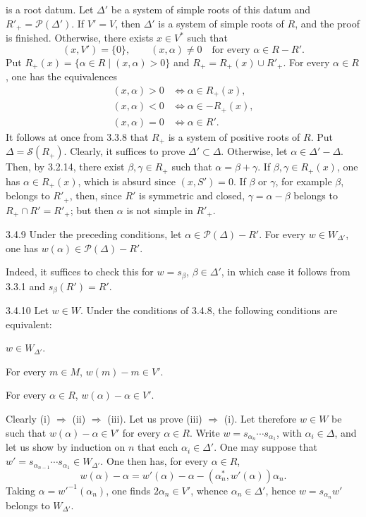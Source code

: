 is a root datum. Let $\Delta'$ be a system of simple roots of this datum and $R'_+=\mathcal P(\Delta')$. If $V'=V$, then $\Delta'$ is a system of simple roots of $R$, and the proof is finished. Otherwise, there exists $x\in V^*$ such that
\[
(x,V')=\{0\},\qquad(x,\alpha)\ne0\quad\text{for every }\alpha\in R-R'.
\]
Put $R_+(x)=\{\alpha\in R\mid(x,\alpha)>0\}$ and $R_+=R_+(x)\cup R'_+$. For every $\alpha\in R$, one has the equivalences
\[
\begin{aligned}
(x,\alpha)>0&\Longleftrightarrow\alpha\in R_+(x),\\
(x,\alpha)<0&\Longleftrightarrow\alpha\in-R_+(x),\\
(x,\alpha)=0&\Longleftrightarrow\alpha\in R'.
\end{aligned}
\]
It follows at once from 3.3.8 that $R_+$ is a system of positive roots of $R$. Put $\Delta=\mathcal S(R_+)$. Clearly, it suffices to prove $\Delta'\subset\Delta$. Otherwise, let $\alpha\in\Delta'-\Delta$. Then, by 3.2.14, there exist $\beta,\gamma\in R_+$ such that $\alpha=\beta+\gamma$. If $\beta,\gamma\in R_+(x)$, one has $\alpha\in R_+(x)$, which is absurd since $(x,S')=0$.
If $\beta$ or $\gamma$, for example $\beta$, belongs to $R'_+$, then, since $R'$ is symmetric and closed, $\gamma=\alpha-\beta$ belongs to $R_+\cap R'=R'_+$; but then $\alpha$ is not simple in $R'_+$.
\begin{lemma}{3.4.9}\label{XXI.3.4.9}
Under the preceding conditions, let $\alpha\in\mathcal P(\Delta)-R'$. For every $w\in W_{\Delta'}$, one has $w(\alpha)\in\mathcal P(\Delta)-R'$.
\end{lemma}
Indeed, it suffices to check this for $w=s_\beta$, $\beta\in\Delta'$, in which case it follows from 3.3.1 and $s_\beta(R')=R'$.
\begin{lemma}{3.4.10}\label{XXI.3.4.10}
Let $w\in W$. Under the conditions of 3.4.8, the following conditions are equivalent:
\begin{enumeratei}
\item $w\in W_{\Delta'}$.
\item For every $m\in M$, $w(m)-m\in V'$.
\item For every $\alpha\in R$, $w(\alpha)-\alpha\in V'$.
\end{enumeratei}
\end{lemma}
Clearly (i) $\Rightarrow$ (ii) $\Rightarrow$ (iii). Let us prove (iii) $\Rightarrow$ (i). Let therefore $w\in W$ be such that $w(\alpha)-\alpha\in V'$ for every $\alpha\in R$. Write $w=s_{\alpha_n}\cdots s_{\alpha_1}$, with $\alpha_i\in\Delta$, and let us show by induction on $n$ that each $\alpha_i\in\Delta'$. One may suppose that $w'=s_{\alpha_{n-1}}\cdots s_{\alpha_1}\in W_{\Delta'}$. One then has, for every $\alpha\in R$,
\[
w(\alpha)-\alpha=w'(\alpha)-\alpha-(\alpha_n^*,w'(\alpha))\alpha_n.
\]
Taking $\alpha=w'^{-1}(\alpha_n)$, one finds $2\alpha_n\in V'$, whence $\alpha_n\in\Delta'$, hence $w=s_{\alpha_n}w'$ belongs to $W_{\Delta'}$.

